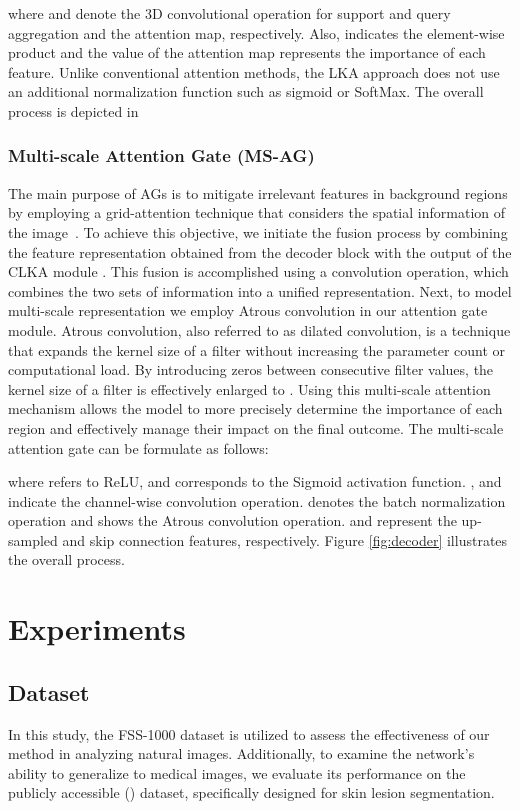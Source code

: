 \documentclass[runningheads]{llncs}
\begin{document}
\noindent where  and  denote the 3D convolutional operation for support and query aggregation and the attention map, respectively. Also,  indicates the element-wise product and the value of the attention map represents the importance of each feature. Unlike conventional attention methods, the LKA approach does not use an additional normalization function such as sigmoid or SoftMax. The overall process is depicted in 

\subsubsection{Multi-scale Attention Gate (MS-AG)}
The main purpose of AGs is to mitigate irrelevant features in background regions by employing a grid-attention technique that considers the spatial information of the image~\cite{oktay2018attention}. 
To achieve this objective, we initiate the fusion process by combining the feature representation obtained from the decoder block  with the output of the CLKA module . This fusion is accomplished using a  convolution operation, which combines the two sets of information into a unified representation.
Next, to model multi-scale representation we employ Atrous convolution in our attention gate module. Atrous convolution, also referred to as dilated convolution, is a technique that expands the kernel size of a filter without increasing the parameter count or computational load. By introducing  zeros between consecutive filter values, the kernel size of a  filter is effectively enlarged to . 
Using this multi-scale attention mechanism allows the model to more precisely determine the importance of each region and effectively manage their impact on the final outcome. 
The multi-scale attention gate  can be formulate as follows:




\noindent where   refers to ReLU, and  corresponds to the Sigmoid activation function. , and  indicate the channel-wise  convolution operation.  denotes the batch normalization operation and  shows the Atrous convolution operation.  and  represent the up-sampled and skip connection features, respectively. Figure \ref{fig:decoder} illustrates the overall process.



\section{Experiments}
\subsection{Dataset}
In this study, the FSS-1000 dataset is utilized to assess the effectiveness of our method in analyzing natural images. Additionally, to examine the network's ability to generalize to medical images, we evaluate its performance on the publicly accessible () dataset, specifically designed for skin lesion segmentation. 
\end{document}
